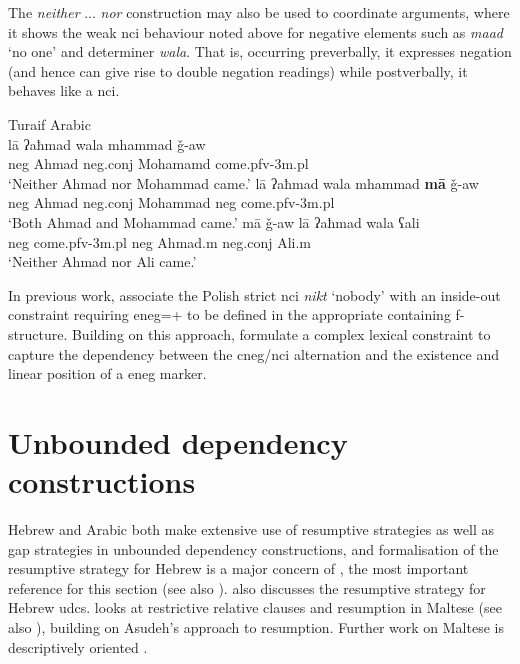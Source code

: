 \documentclass[output=paper,hidelinks]{langscibook}
\begin{document}
 The {\em neither} ... {\em nor}  construction may also be used to coordinate arguments, where it shows the weak {\sc nci} behaviour noted above for negative elements such as {\em ma{\hwithstroke}ad} `no one' and determiner {\em wala}. That is, occurring preverbally, it expresses negation (and hence can give rise to double negation readings) while postverbally, it behaves like a {\sc nci}.\largerpage[1.5]


\ea \label{res} Turaif Arabic \citep[34,40]{AlruwailiSadler:2018}\\
\ea
\gll
 l\={a} {ʔ}aħmad wala mhammad \v{g}-aw\\
 {\sc neg} Ahmad {\sc neg.conj} Mohamamd come.{\sc pfv-3m.pl}\\
\glt `Neither Ahmad nor Mohammad came.'
\ex
\gll
 l\={a} {ʔ}aħmad wala mhammad {\bf m\={a}}  \v{g}-aw\\
{\sc neg} Ahmad {\sc neg.conj} Mohammad {\sc neg} come.{\sc pfv-3m.pl}\\
\glt `Both Ahmad and Mohammad came.'%
\ex  \label{dep-nc}
\gll
m\={a} \v{g}-aw l\={a} {ʔ}aħmad  wala ʕali\\
{\sc neg} come.{\sc pfv-3m.pl} {\sc neg} Ahmad.{\sc m} {\sc neg.conj} Ali.{\sc m}\\
\glt `Neither Ahmad nor Ali came.'%
\z
\z









In previous work,  \citet{przepiorkowski2015two}
associate the Polish strict {\sc nci} {\em nikt} `nobody' with an inside-out constraint requiring {\sc eneg}=+ to be defined in the appropriate containing f-structure. Building on this approach, \citet{AlruwailiSadler:2018} formulate a complex lexical constraint to capture the dependency between  the {\sc cneg}/{\sc nci} alternation and the existence and linear position of a {\sc eneg} marker.







\section{Unbounded dependency constructions}

Hebrew and Arabic both make extensive use of resumptive strategies as well as gap strategies in unbounded dependency constructions, and formalisation of the resumptive strategy for Hebrew is a major concern of \citet{Asudeh12}, the most important reference for this section (see also \citealt{Asudeh10}).   \citet{Falk2002} also discusses the resumptive strategy for Hebrew {\sc udc}s.  \citet{CamSad11:LFG} looks at restrictive relative clauses and resumption in Maltese (see also \citealt{CamSad:NRRC}), building on Asudeh's approach to resumption.
Further work on Maltese is descriptively oriented \citep{CamSad:2015,CamSad:FRC}.
\end{document}
